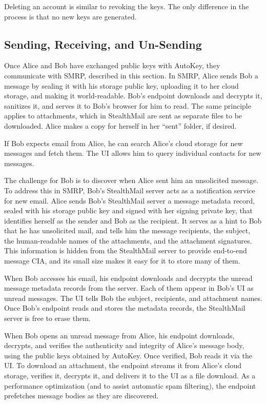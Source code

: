 Deleting an account is similar to revoking the keys.  The only difference in the process is that no new keys are generated.

\subsection{Sending, Receiving, and Un-Sending}
Once Alice and Bob have exchanged public keys with AutoKey, they communicate with SMRP, described in this section.  In SMRP, Alice sends Bob a message by sealing it with his storage public key, uploading it to her cloud storage, and making it world-readable. Bob’s endpoint downloads and decrypts it, sanitizes it, and serves it to Bob’s browser for him to read. The same principle applies to attachments, which in StealthMail are sent as separate files to be downloaded.  Alice makes a copy for herself in her ``sent'' folder, if desired.

If Bob expects email from Alice, he can search Alice’s cloud storage for new messages and fetch them.  The UI allows him to query individual contacts for new messages.

The challenge for Bob is to discover when Alice sent him an unsolicited message.  To address this in SMRP, Bob’s StealthMail server acts as a notification service for new email.  Alice sends Bob's StealthMail server a message metadata record, sealed with his storage public key and signed with her signing private key, that identifies herself as the sender and Bob as the recipient.  It serves as a hint to Bob that he has unsolicited mail, and tells him the message recipients, the subject, the human-readable names of the attachments, and the attachment signatures.  This information is hidden from the StealthMail server to provide end-to-end message CIA, and its small size makes it easy for it to store many of them.

When Bob accesses his email, his endpoint downloads and decrypts the unread message metadata records from the server.  Each of them appear in Bob's UI as unread messages. The UI tells Bob the subject, recipients, and attachment names.  Once Bob's endpoint reads and stores the metadata records, the StealthMail server is free to erase them.  

When Bob opens an unread message from Alice, his endpoint downloads, decrypts, and verifies the authenticity and integrity of Alice's message body, using the public keys obtained by AutoKey. Once verified, Bob reads it via the UI. To download an attachment, the endpoint streams it from Alice's cloud storage, verifies it, decrypts it, and delivers it to the UI as a file download.  As a performance optimization (and to assist automatic spam filtering), the endpoint prefetches message bodies as they are discovered.

